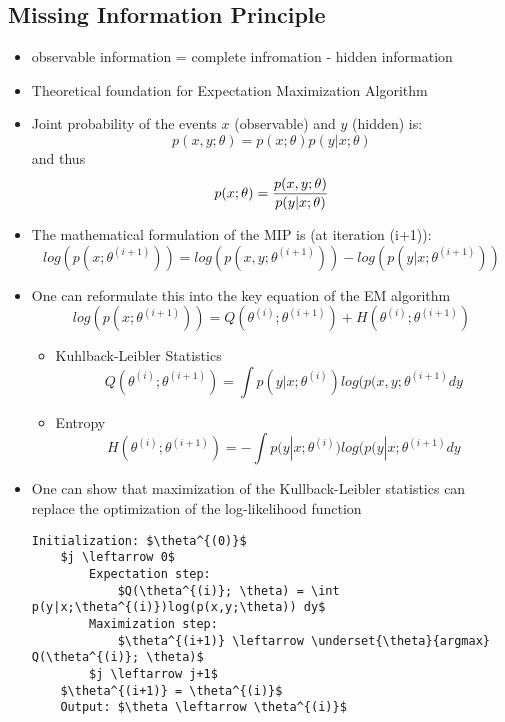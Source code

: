 \subsection*{Missing Information Principle}
\begin{itemize}
    \item
        observable information = complete infromation - hidden information
    \item
        Theoretical foundation for Expectation Maximization Algorithm
    \item
        Joint probability of the events $x$ (observable) and $y$ (hidden) is: 
        $$p(x,y;\theta) = p(x;\theta)p(y|x;\theta)$$
        and thus
        $$p(x;\theta) = \frac{\displaystyle p(x,y;\theta)}{\displaystyle p(y|x;\theta)}$$
    \item
        The mathematical formulation of the MIP is (at iteration (i+1)):
        $$log(p(x;\theta^{(i+1)})) = log(p(x,y;\theta^{(i+1)})) - log(p(y|x;\theta^{(i+1)}))$$
    \item
        One can reformulate this into the key equation of the EM algorithm
        $$log(p(x;\theta^{(i+1)})) = Q(\theta^{(i)}; \theta^{(i+1)}) + H (\theta^{(i)}; \theta^{(i+1)})$$
        \begin{itemize}
            \item
                Kuhlback-Leibler Statistics
                $$ Q(\theta^{(i)}; \theta^{(i+1)}) = \int p(y|x;\theta^{(i)})log(p(x,y;\theta^{(i+1)}dy$$
            \item
                Entropy
                $$ H(\theta^{(i)}; \theta^{(i+1)}) = - \int p(y|x;\theta^{(i)})log(p(y|x;\theta^{(i+1)}dy$$
        \end{itemize}
    \item
        One can show that maximization of the Kullback-Leibler statistics can replace the optimization of the log-likelihood function
\begin{lstlisting}[mathescape]
    Initialization: $\theta^{(0)}$
    $j \leftarrow 0$
        Expectation step:
            $Q(\theta^{(i)}; \theta) = \int p(y|x;\theta^{(i)})log(p(x,y;\theta)) dy$
        Maximization step:
            $\theta^{(i+1)} \leftarrow \underset{\theta}{argmax} Q(\theta^{(i)}; \theta)$
        $j \leftarrow j+1$
    $\theta^{(i+1)} = \theta^{(i)}$
    Output: $\theta \leftarrow \theta^{(i)}$
\end{lstlisting}
\end{itemize}

